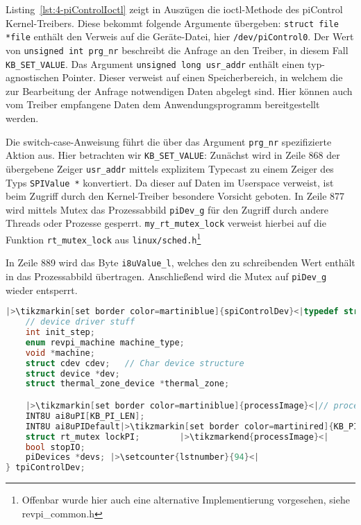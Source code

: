 Listing~\ref{lst:4-piControlIoctl} zeigt in Auszügen die ioctl-Methode des piControl Kernel-Treibers. Diese bekommt folgende Argumente übergeben: \lstinline{struct file *file} enthält den Verweis auf die Geräte-Datei, hier \lstinline{/dev/piControl0}. Der Wert von \lstinline{unsigned int prg_nr} beschreibt die Anfrage an den Treiber, in diesem Fall \lstinline{KB_SET_VALUE}. Das Argument \lstinline{unsigned long usr_addr} enthält einen typ-agnostischen Pointer. Dieser verweist auf einen Speicherbereich, in welchem die zur Bearbeitung der Anfrage notwendigen Daten abgelegt sind. Hier können auch vom Treiber empfangene Daten dem Anwendungsprogramm bereitgestellt werden. 

Die switch-case-Anweisung führt die über das Argument \lstinline{prg_nr} spezifizierte Aktion aus. Hier betrachten wir \lstinline{KB_SET_VALUE}:
Zunächst wird in Zeile 868 der übergebene Zeiger \lstinline{usr_addr} mittels explizitem Typecast zu einem Zeiger des Typs \lstinline{SPIValue *} konvertiert. Da dieser auf Daten im Userspace verweist, ist beim Zugriff durch den Kernel-Treiber besondere Vorsicht geboten.
In Zeile 877 wird mittels Mutex das Prozessabbild \lstinline{piDev_g} für den Zugriff durch andere Threads oder Prozesse gesperrt.
\lstinline{my_rt_mutex_lock} verweist hierbei auf die Funktion \lstinline{rt_mutex_lock} aus \lstinline{linux/sched.h}\footnote{Offenbar wurde hier auch eine alternative Implementierung vorgesehen, siehe revpi\_common.h}

In Zeile 889 wird das Byte \lstinline{i8uValue_l}, welches den zu schreibenden Wert enthält in das Prozessabbild übertragen. Anschließend wird die Mutex auf \lstinline{piDev_g} wieder entsperrt.
\newpage

\begin{lstlisting}[language={c},firstnumber=62,caption={Auszug des Struct \lstinline{spiControlDev} in \lstinline{piControlMain.h}\label{lst:4-spiControlDev}}]
|>\tikzmarkin[set border color=martiniblue]{spiControlDev}<|typedef struct spiControlDev|>\tikzmarkend{spiControlDev}<| {
	// device driver stuff
	int init_step;
	enum revpi_machine machine_type;
	void *machine;
	struct cdev cdev;	// Char device structure
	struct device *dev;
	struct thermal_zone_device *thermal_zone;

	|>\tikzmarkin[set border color=martiniblue]{processImage}<|// process image stuff
	INT8U ai8uPI[KB_PI_LEN];
	INT8U ai8uPIDefault|>\tikzmarkin[set border color=martinired]{KB_PI_LEN_0}<|[KB_PI_LEN]|>\tikzmarkend{KB_PI_LEN_0}<|;
	struct rt_mutex lockPI;        |>\tikzmarkend{processImage}<|
	bool stopIO;
	piDevices *devs; |>\setcounter{lstnumber}{94}<|
} tpiControlDev;
\end{lstlisting}

